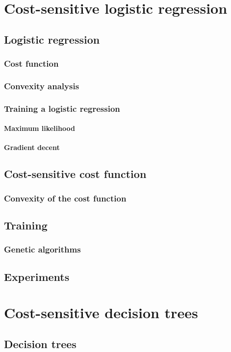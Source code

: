 \documentclass[twoside,openright,titlepage,numbers=noenddot,headinclude,%
               footinclude=true,cleardoublepage=empty,abstractoff,BCOR=5mm,%
               paper=a4,fontsize=11pt,ngerman,american]{scrreprt}
\numberwithin{theorem}{chapter}
\numberwithin{definition}{chapter}
\numberwithin{algorithm}{chapter}
\numberwithin{figure}{chapter}
\numberwithin{table}{chapter}
\numberwithin{equation}{chapter}
\begin{document}
	\chapter{Cost-sensitive logistic regression}
		\section{Logistic regression}
			\subsection{Cost function}
				\subsection{Convexity analysis}
			\subsection{Training a logistic regression}
				\subsubsection{Maximum likelihood}
				\subsubsection{Gradient decent}
		\section{Cost-sensitive cost function}
			\subsection{Convexity of the cost function}
		\section{Training}	
			\subsection{Genetic algorithms}
		\section{Experiments}

	\chapter{Cost-sensitive decision trees}
		\section{Decision trees}
\end{document}
